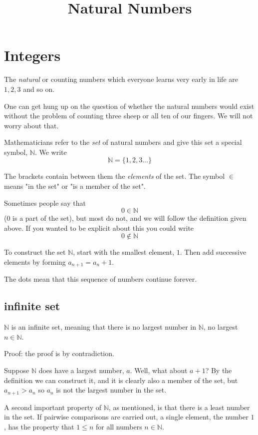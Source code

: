 \documentclass[11pt, oneside]{article}
\title{Natural Numbers}
\date{}
\begin{document}
\maketitle
\Large
\section*{Integers}

The \emph{natural} or counting numbers which everyone learns very early in life are $1, 2, 3$ and so on.

One can get hung up on the question of whether the natural numbers would exist without the problem of counting three sheep or all ten of our fingers.  We will not worry about that.

Mathematicians refer to the \emph{set} of natural numbers and give this set a special symbol, $\mathbb{N}$.  We write
\[ \mathbb{N} = \{ 1, 2, 3 \dots \} \]

The brackets contain between them the \emph{elements} of the set.  The symbol $\in$ means "in the set" or "is a member of the set".

Sometimes people say that
\[ 0 \in \mathbb{N} \]
(0 is a part of the set), but most do not, and we will follow the definition given above.  If you wanted to be explicit about this you could write
\[ 0 \notin \mathbb{N} \]

To construct the set $\mathbb{N}$, start with the smallest element, $1$.  Then add successive elements by forming $a_{n+1} = a_n + 1$.

The dots mean that this sequence of numbers continue forever.  

\subsection*{infinite set}

$\mathbb{N}$ is an infinite set, meaning that there is no largest number in $\mathbb{N}$, no largest $n \in \mathbb{N}$.

Proof:  the proof is by contradiction.  

Suppose $\mathbb{N}$ does have a largest number, $a$.  Well, what about $a + 1$?  By the definition we can construct it, and it is clearly also a member of the set, but $a_{n+1} > a_n$ so $a_n$ is not the largest number in the set.

A second important property of $\mathbb{N}$, as mentioned, is that there is a least number in the set.  If pairwise comparisons are carried out, a single element, the number $1$, has the property that $1 \le n$ for all numbers $n \in \mathbb{N}$.
\end{document}
